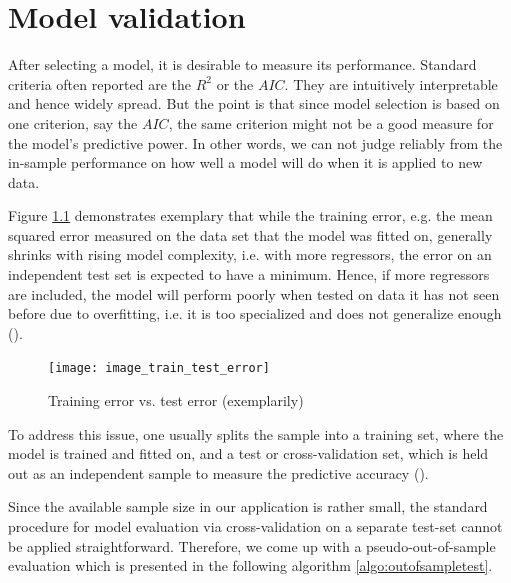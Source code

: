 \documentclass[a4paper, 11pt]{scrreprt}
\begin{document}
\chapter{Model validation}\label{par:modelvalidation}

After selecting a model, it is desirable to measure its performance. Standard criteria often reported are the $R^2$ or the $AIC$. They are intuitively interpretable and hence widely spread. But the point is that since model selection is based on one criterion, say the $AIC$, the same criterion might not be a good measure for the model's predictive power. In other words, we can not judge reliably from the in-sample performance on how well a model will do when it is applied to new data.

Figure \ref{train_test} demonstrates exemplary that while the training error, e.g. the mean squared error measured on the data set that the model was fitted on, generally shrinks with rising model complexity, i.e. with more regressors, the error on an independent test set is expected to have a minimum. Hence, if more regressors are included, the model will perform poorly when tested on data it has not seen before due to overfitting, i.e. it is too specialized and does not generalize enough (\textcite[p. 2]{hawkins2004overfitting}).

\begin{figure}[H]
	\texttt{[image: image\_train\_test\_error]}
	\centering
	\caption{Training error vs. test error (exemplarily)}
	\label{train_test}
\end{figure}

To address this issue, one usually splits the sample into a training set, where the model is trained and fitted on, and a test or cross-validation set, which is held out as an independent sample to measure the predictive accuracy (\textcite[p. 5]{hawkins2004overfitting}).

Since the available sample size in our application is rather small, the standard procedure for model evaluation via cross-validation on a separate test-set cannot be applied straightforward. Therefore, we come up with a pseudo-out-of-sample evaluation which is presented in the following algorithm \ref{algo:outofsampletest}.
\end{document}
